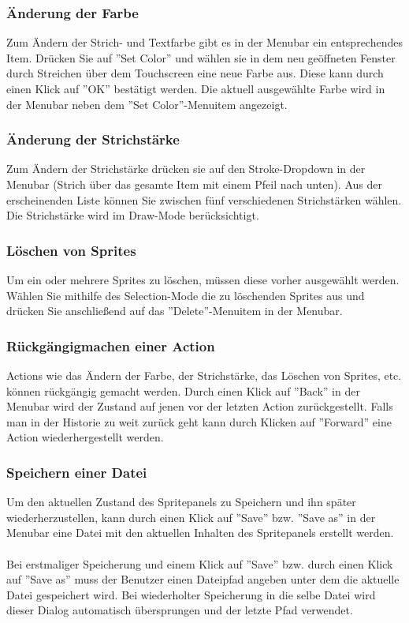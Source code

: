 \subsubsection{Änderung der Farbe}

Zum Ändern der Strich- und Textfarbe gibt es in der Menubar ein entsprechendes Item. Drücken Sie auf ''Set Color'' und wählen sie in dem neu geöffneten Fenster durch Streichen über dem Touchscreen eine neue Farbe aus. Diese kann durch einen Klick auf ''OK'' bestätigt werden. Die aktuell ausgewählte Farbe wird in der Menubar neben dem ''Set Color''-Menuitem angezeigt.

\subsubsection{Änderung der Strichstärke}

Zum Ändern der Strichstärke drücken sie auf den Stroke-Dropdown in der Menubar (Strich über das gesamte Item mit einem Pfeil nach unten). Aus der erscheinenden Liste können Sie zwischen fünf verschiedenen Strichstärken wählen. Die Strichstärke wird im Draw-Mode berücksichtigt.

\subsubsection{Löschen von Sprites}

Um ein oder mehrere Sprites zu löschen, müssen diese vorher ausgewählt werden. Wählen Sie mithilfe des Selection-Mode die zu löschenden Sprites aus und drücken Sie anschließend auf das ''Delete''-Menuitem in der Menubar.

\subsubsection{Rückgängigmachen einer Action}

Actions wie das Ändern der Farbe, der Strichstärke, das Löschen von Sprites, etc. können rückgängig gemacht werden. Durch einen Klick auf ''Back'' in der Menubar wird der Zustand auf jenen vor der letzten Action zurückgestellt. Falls man in der Historie zu weit zurück geht kann durch Klicken auf ''Forward'' eine Action wiederhergestellt werden.

\subsubsection{Speichern einer Datei}

Um den aktuellen Zustand des Spritepanels zu Speichern und ihn später wiederherzustellen, kann durch einen Klick auf ''Save'' bzw. ''Save as'' in der Menubar eine Datei mit den aktuellen Inhalten des Spritepanels erstellt werden.\\
\\
Bei erstmaliger Speicherung und einem Klick auf ''Save'' bzw. durch einen Klick auf ''Save as'' muss der Benutzer einen Dateipfad angeben unter dem die aktuelle Datei gespeichert wird. Bei wiederholter Speicherung in die selbe Datei wird dieser Dialog automatisch übersprungen und der letzte Pfad verwendet.


